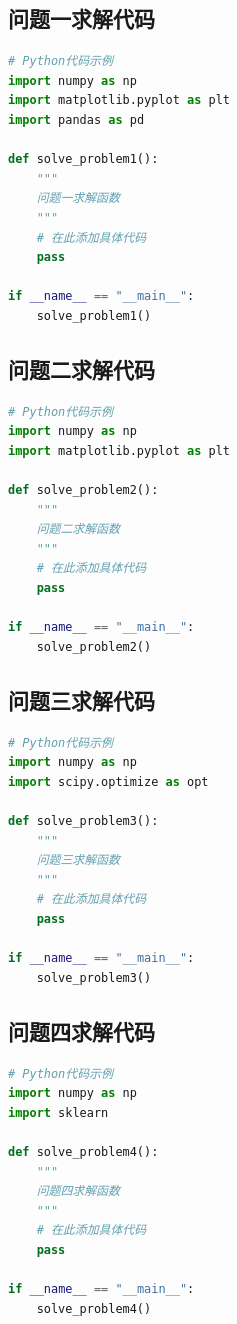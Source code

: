 \documentclass[fontset=SimSun]{ctexart}
\begin{document}
\subsection{问题一求解代码}

\begin{lstlisting}[language=Python, caption=问题一求解代码]
# Python代码示例
import numpy as np
import matplotlib.pyplot as plt
import pandas as pd

def solve_problem1():
    """
    问题一求解函数
    """
    # 在此添加具体代码
    pass

if __name__ == "__main__":
    solve_problem1()
\end{lstlisting}

\subsection{问题二求解代码}

\begin{lstlisting}[language=Python, caption=问题二求解代码]
# Python代码示例
import numpy as np
import matplotlib.pyplot as plt

def solve_problem2():
    """
    问题二求解函数
    """
    # 在此添加具体代码
    pass

if __name__ == "__main__":
    solve_problem2()
\end{lstlisting}

\subsection{问题三求解代码}

\begin{lstlisting}[language=Python, caption=问题三求解代码]
# Python代码示例
import numpy as np
import scipy.optimize as opt

def solve_problem3():
    """
    问题三求解函数
    """
    # 在此添加具体代码
    pass

if __name__ == "__main__":
    solve_problem3()
\end{lstlisting}

\subsection{问题四求解代码}

\begin{lstlisting}[language=Python, caption=问题四求解代码]
# Python代码示例
import numpy as np
import sklearn

def solve_problem4():
    """
    问题四求解函数
    """
    # 在此添加具体代码
    pass

if __name__ == "__main__":
    solve_problem4()
\end{lstlisting}
\end{document}
